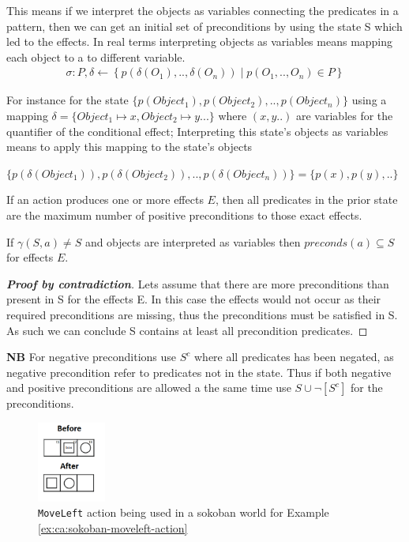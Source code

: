 \documentclass[../Master.tex]{subfiles}
\begin{document}
This means if we interpret the objects as variables connecting the predicates in a pattern, then we can get an initial set of preconditions by using the state S which led to the effects. In real terms interpreting objects as variables means mapping each object 
to a to different variable.
\begin{align}
	&\sigma : P, \delta \leftarrow \left\{p\left(\delta(O_1),..,\delta(O_n) \right) \mid p(O_1,..,O_n) \in P  \right\}  &
\end{align}



For instance for the state
$\{ p(Object_1), p(Object_2),..,p(Object_n)\}$ using a mapping
$\delta = \{Object_1 \mapsto x, Object_2 \mapsto y...\}$
where $(x, y..)$ are variables for the quantifier of the conditional effect; Interpreting this state's objects as variables means to apply this mapping to the state's objects

$\{ p(\delta(Object_1)), p(\delta(Object_2)),..,p(\delta(Object_n))\} = \{ p(x), p(y),..\}$

\begin{theorem}\label{thm:ca:precondition-state}
If an action produces one or more effects $E$, then all predicates in the prior state are the maximum number of positive preconditions to those exact effects.

If $\gamma (S,a) \neq S$ and objects are interpreted as variables then $preconds(a) \subseteq S$  for effects $E$.

\begin{proof}[\textbf{Proof by contradiction}] Lets assume that there are more preconditions than present in S for the effects E.
	In this case the effects would not occur as their required preconditions are missing, thus the preconditions must be satisfied in S.
	As such we can conclude S contains at least all precondition predicates.    \qedhere
\end{proof}
\end{theorem}

\textbf{NB} For negative preconditions use $S^c$ where all predicates has been negated, as negative precondition refer to predicates not in the state.
Thus if both negative and positive preconditions are allowed a the same time use  $S \cup \neg[S^c] $ for the preconditions.

\begin{figure}
	\centering
	\includegraphics[width=0.2\textwidth]{../Graphics/soko_cond_example.png}

	\caption{\label{fig:ca:sokoban-moveleft-action}\texttt{MoveLeft} action being used in a sokoban world for Example \ref{ex:ca:sokoban-moveleft-action} }

\end{figure}
\end{document}
